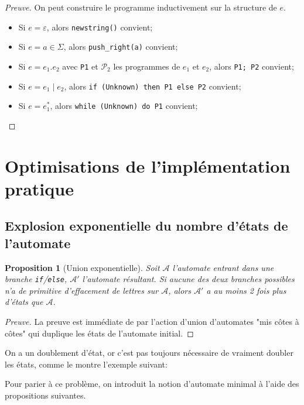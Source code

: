 \documentclass{article}
\newenvironment{preuve}{\begin{proof}[Preuve]}{\end{proof}}
\newtheorem{proposition}{Proposition}
\begin{document}
\begin{preuve}
    On peut construire le programme inductivement sur la structure de $e$.
    \begin{itemize}
        \item Si $e = \varepsilon$, alors \texttt{newstring()} convient;
        \item Si $e = a \in \Sigma$, alors \texttt{push\_right(a)} convient;
        \item Si $e = e_1.e_2$ avec \texttt{P1} et $\mathcal{P}_2$ les programmes de $e_1$ et $e_2$, alors \texttt{P1; P2} convient;
        \item Si $e = e_1 \;|\; e_2$, alors \texttt{if (Unknown) then P1 else P2} convient;
        \item Si $e = e_1^*$, alors \texttt{while (Unknown) do P1} convient;
    \end{itemize}
\end{preuve}

\section{Optimisations de l'implémentation pratique}

\subsection{Explosion exponentielle du nombre d'états de l'automate}

\begin{proposition}[Union exponentielle]
    Soit $\mathcal{A}$ l'automate entrant dans une branche \texttt{if}/\texttt{else}, $\mathcal{A'}$
    l'automate résultant. Si aucune des deux branches possibles n'a de primitive d'effacement de lettres sur $\mathcal{A}$,
    alors $\mathcal{A'}$ a au moins 2 fois plus d'états que $\mathcal{A}$.
\end{proposition} 

\begin{preuve}
    La preuve est immédiate de par l'action d'union d'automates "mis côtes à côtes" qui duplique
    les états de l'automate initial.
\end{preuve}

On a un doublement d'état, or c'est pas toujours nécessaire de vraiment doubler les états,
comme le montre l'exemple suivant:

Pour parier à ce problème, on introduit la notion d'automate minimal à l'aide des propositions suivantes.
\end{document}
